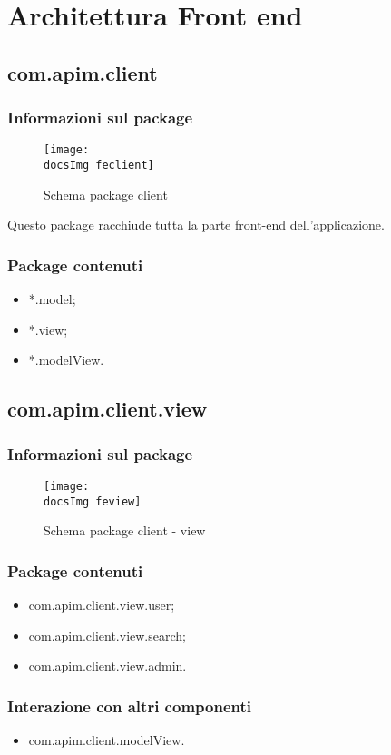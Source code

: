\section{Architettura Front end}{
	\subsection{com.apim.client}{
		\subsubsection{Informazioni sul package}{
			\begin{figure}[ht]
				\centering
				\texttt{[image: \\docsImg feclient]}
				\caption{Schema package client}
			\end{figure}
		Questo package racchiude tutta la parte front-end dell'applicazione.
		}
		\subsubsection {Package contenuti}{
			\begin{itemize}
				\item *.model;
				\item *.view;
				\item *.modelView.
			\end{itemize}
		}
	}
	\subsection{com.apim.client.view}{
		\subsubsection{Informazioni sul package}{
			\begin{figure}[ht]
				\centering
				\texttt{[image: \\docsImg feview]}
				\caption{Schema package client - view}
			\end{figure}
		}
		\subsubsection{Package contenuti}{
			\begin{itemize}
				\item com.apim.client.view.user;
				\item com.apim.client.view.search;
				\item com.apim.client.view.admin.
			\end{itemize}
		}
		\subsubsection{Interazione con altri componenti}{
			\begin{itemize}
				\item com.apim.client.modelView.
			\end{itemize}
		}
}}
